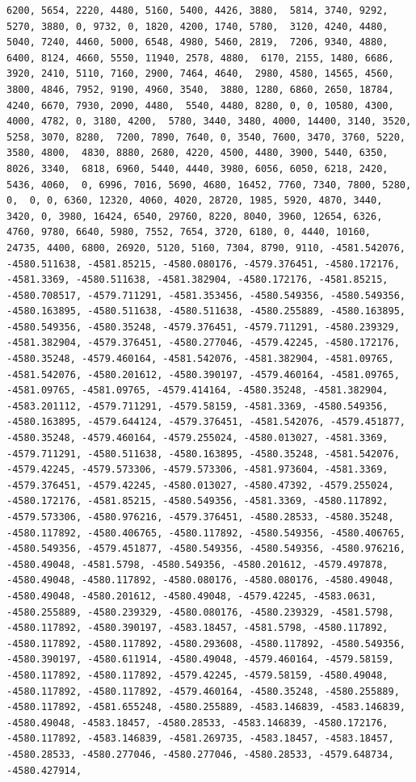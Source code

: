 \documentclass[
]{article}
\begin{document}
\begin{verbatim}
6200, 5654, 2220, 4480, 5160, 5400, 4426, 3880,  5814, 3740, 9292, 5270, 3880, 0, 9732, 0, 1820, 4200, 1740, 5780,  3120, 4240, 4480, 5040, 7240, 4460, 5000, 6548, 4980, 5460, 2819,  7206, 9340, 4880, 6400, 8124, 4660, 5550, 11940, 2578, 4880,  6170, 2155, 1480, 6686, 3920, 2410, 5110, 7160, 2900, 7464, 4640,  2980, 4580, 14565, 4560, 3800, 4846, 7952, 9190, 4960, 3540,  3880, 1280, 6860, 2650, 18784, 4240, 6670, 7930, 2090, 4480,  5540, 4480, 8280, 0, 0, 10580, 4300, 4000, 4782, 0, 3180, 4200,  5780, 3440, 3480, 4000, 14400, 3140, 3520, 5258, 3070, 8280,  7200, 7890, 7640, 0, 3540, 7600, 3470, 3760, 5220, 3580, 4800,  4830, 8880, 2680, 4220, 4500, 4480, 3900, 5440, 6350, 8026, 3340,  6818, 6960, 5440, 4440, 3980, 6056, 6050, 6218, 2420, 5436, 4060,  0, 6996, 7016, 5690, 4680, 16452, 7760, 7340, 7800, 5280, 0,  0, 0, 6360, 12320, 4060, 4020, 28720, 1985, 5920, 4870, 3440,  3420, 0, 3980, 16424, 6540, 29760, 8220, 8040, 3960, 12654, 6326,  4760, 9780, 6640, 5980, 7552, 7654, 3720, 6180, 0, 4440, 10160,  24735, 4400, 6800, 26920, 5120, 5160, 7304, 8790, 9110, -4581.542076,  -4580.511638, -4581.85215, -4580.080176, -4579.376451, -4580.172176,  -4581.3369, -4580.511638, -4581.382904, -4580.172176, -4581.85215,  -4580.708517, -4579.711291, -4581.353456, -4580.549356, -4580.549356,  -4580.163895, -4580.511638, -4580.511638, -4580.255889, -4580.163895,  -4580.549356, -4580.35248, -4579.376451, -4579.711291, -4580.239329,  -4581.382904, -4579.376451, -4580.277046, -4579.42245, -4580.172176,  -4580.35248, -4579.460164, -4581.542076, -4581.382904, -4581.09765,  -4581.542076, -4580.201612, -4580.390197, -4579.460164, -4581.09765,  -4581.09765, -4581.09765, -4579.414164, -4580.35248, -4581.382904,  -4583.201112, -4579.711291, -4579.58159, -4581.3369, -4580.549356,  -4580.163895, -4579.644124, -4579.376451, -4581.542076, -4579.451877,  -4580.35248, -4579.460164, -4579.255024, -4580.013027, -4581.3369,  -4579.711291, -4580.511638, -4580.163895, -4580.35248, -4581.542076,  -4579.42245, -4579.573306, -4579.573306, -4581.973604, -4581.3369,  -4579.376451, -4579.42245, -4580.013027, -4580.47392, -4579.255024,  -4580.172176, -4581.85215, -4580.549356, -4581.3369, -4580.117892,  -4579.573306, -4580.976216, -4579.376451, -4580.28533, -4580.35248,  -4580.117892, -4580.406765, -4580.117892, -4580.549356, -4580.406765,  -4580.549356, -4579.451877, -4580.549356, -4580.549356, -4580.976216,  -4580.49048, -4581.5798, -4580.549356, -4580.201612, -4579.497878,  -4580.49048, -4580.117892, -4580.080176, -4580.080176, -4580.49048,  -4580.49048, -4580.201612, -4580.49048, -4579.42245, -4583.0631,  -4580.255889, -4580.239329, -4580.080176, -4580.239329, -4581.5798,  -4580.117892, -4580.390197, -4583.18457, -4581.5798, -4580.117892,  -4580.117892, -4580.117892, -4580.293608, -4580.117892, -4580.549356,  -4580.390197, -4580.611914, -4580.49048, -4579.460164, -4579.58159,  -4580.117892, -4580.117892, -4579.42245, -4579.58159, -4580.49048,  -4580.117892, -4580.117892, -4579.460164, -4580.35248, -4580.255889,  -4580.117892, -4581.655248, -4580.255889, -4583.146839, -4583.146839,  -4580.49048, -4583.18457, -4580.28533, -4583.146839, -4580.172176,  -4580.117892, -4583.146839, -4581.269735, -4583.18457, -4583.18457,  -4580.28533, -4580.277046, -4580.277046, -4580.28533, -4579.648734,  -4580.427914, 
\end{verbatim}
\end{document}

